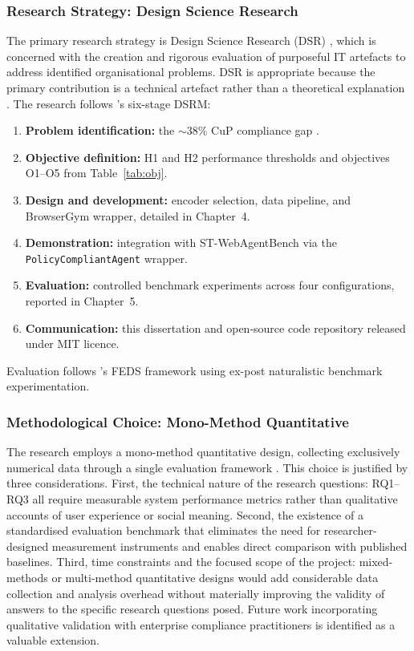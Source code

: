 \documentclass[12pt,a4paper]{article}
\begin{document}
\subsubsection{Research Strategy: Design Science Research}

The primary research strategy is Design Science Research (DSR)
\citep{hevner2004design}, which is concerned with the creation and rigorous
evaluation of purposeful IT artefacts to address identified organisational
problems.  DSR is appropriate because the primary contribution is a technical artefact
rather than a theoretical explanation \citep{march1995design}. The research
follows \citet{peffers2007dsrm}'s six-stage DSRM:

\begin{enumerate}[noitemsep,leftmargin=2em]
  \item \textbf{Problem identification:} the $\sim$38\% CuP compliance gap
    \citep{levy2026stwebagentbench}.
  \item \textbf{Objective definition:} H1 and H2 performance thresholds and
    objectives O1--O5 from Table~\ref{tab:obj}.
  \item \textbf{Design and development:} encoder selection, data pipeline,
    and BrowserGym wrapper, detailed in Chapter~4.
  \item \textbf{Demonstration:} integration with ST-WebAgentBench via the
    \texttt{PolicyCompliantAgent} wrapper.
  \item \textbf{Evaluation:} controlled benchmark experiments across four
    configurations, reported in Chapter~5.
  \item \textbf{Communication:} this dissertation and open-source code
    repository released under MIT licence.
\end{enumerate}

Evaluation follows \citet{venable2016feds}'s FEDS framework using ex-post
naturalistic benchmark experimentation.

\subsubsection{Methodological Choice: Mono-Method Quantitative}

The research employs a mono-method quantitative design, collecting exclusively
numerical data through a single evaluation framework \citep{saunders2019research}.
This choice is justified by three considerations. First, the technical nature of
the research questions: RQ1--RQ3 all require measurable system performance metrics
rather than qualitative accounts of user experience or social meaning. Second, the
existence of a standardised evaluation benchmark that eliminates the need for
researcher-designed measurement instruments and enables direct comparison with
published baselines. Third, time constraints and the focused scope of the project:
mixed-methods or multi-method quantitative designs would add considerable data
collection and analysis overhead without materially improving the validity of
answers to the specific research questions posed. Future work incorporating
qualitative validation with enterprise compliance practitioners is identified as a
valuable extension.
\end{document}
